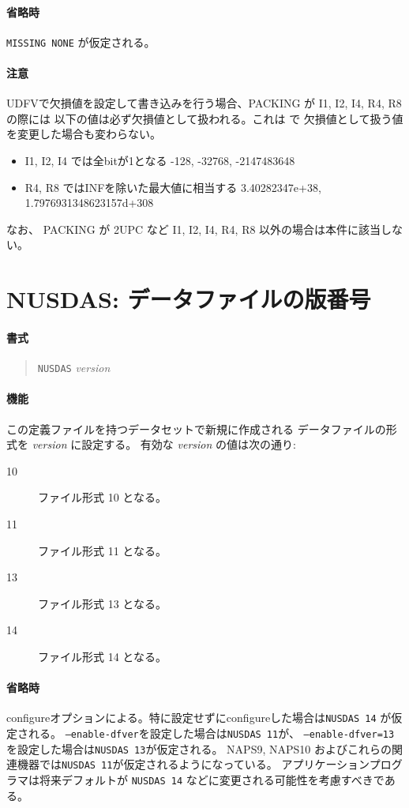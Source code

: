 \paragraph{省略時}
{\tt MISSING NONE} が仮定される。
\paragraph{注意}
UDFVで欠損値を設定して書き込みを行う場合、PACKING が I1, I2, I4, R4, R8 の際には
以下の値は必ず欠損値として扱われる。これは
で
欠損値として扱う値を変更した場合も変わらない。
\begin{itemize}
\item I1, I2, I4 では全bitが1となる -128, -32768, -2147483648
\item R4, R8 ではINFを除いた最大値に相当する 3.40282347e+38, 1.7976931348623157d+308
\end{itemize}
なお、 PACKING が 2UPC など I1, I2, I4, R4, R8 以外の場合は本件に該当しない。

\section{NUSDAS: データファイルの版番号}
\label{sec:def:NUSDAS}
\paragraph{書式}
\begin{quote}
{\tt NUSDAS} {\it version}
\end{quote}
\paragraph{機能}
この定義ファイルを持つデータセットで新規に作成される
データファイルの形式を {\it version} に設定する。
有効な {\it version} の値は次の通り:
\begin{description}
\item[10] ファイル形式 10 となる。
\item[11] ファイル形式 11 となる。
\item[13] ファイル形式 13 となる。
\item[14] ファイル形式 14 となる。
\end{description}
\paragraph{省略時}
configureオプションによる。特に設定せずにconfigureした場合は{\tt NUSDAS 14} が仮定される。
{\tt --enable-dfver}を設定した場合は{\tt NUSDAS 11}が、
{\tt --enable-dfver=13}を設定した場合は{\tt NUSDAS 13}が仮定される。
NAPS9, NAPS10 およびこれらの関連機器では{\tt NUSDAS 11}が仮定されるようになっている。
アプリケーションプログラマは将来デフォルトが
{\tt NUSDAS 14} などに変更される可能性を考慮すべきである。

